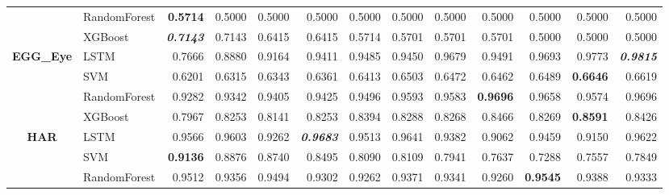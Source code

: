 \begin{table}[H]
\begin{adjustbox}{max width=14cm}
\begin{tabular}{|c|l|r|r|r|r|r|r|r|r|r|r|r|}
			                      & RandomForest & \textbf{0.5714}          & 0.5000          & 0.5000          & 0.5000                   & 0.5000 & 0.5000          & 0.5000 & 0.5000          & 0.5000                   & 0.5000          & 0.5000                   \\
			                      & XGBoost      & \textit{\textbf{0.7143}} & 0.7143          & 0.6415          & 0.6415                   & 0.5714 & 0.5701          & 0.5701 & 0.5701          & 0.5000                   & 0.5000          & 0.5000                   \\
			\hline
			\textbf{EGG\_Eye}     & LSTM         & 0.7666                   & 0.8880          & 0.9164          & 0.9411                   & 0.9485 & 0.9450          & 0.9679 & 0.9491          & 0.9693                   & 0.9773          & \textit{\textbf{0.9815}} \\
			                      & SVM          & 0.6201                   & 0.6315          & 0.6343          & 0.6361                   & 0.6413 & 0.6503          & 0.6472 & 0.6462          & 0.6489                   & \textbf{0.6646} & 0.6619                   \\
			                      & RandomForest & 0.9282                   & 0.9342          & 0.9405          & 0.9425                   & 0.9496 & 0.9593          & 0.9583 & \textbf{0.9696} & 0.9658                   & 0.9574          & 0.9696                   \\
			                      & XGBoost      & 0.7967                   & 0.8253          & 0.8141          & 0.8253                   & 0.8394 & 0.8288          & 0.8268 & 0.8466          & 0.8269                   & \textbf{0.8591} & 0.8426                   \\
			\hline
			\textbf{HAR}          & LSTM         & 0.9566                   & 0.9603          & 0.9262          & \textit{\textbf{0.9683}} & 0.9513 & 0.9641          & 0.9382 & 0.9062          & 0.9459                   & 0.9150          & 0.9622                   \\
			                      & SVM          & \textbf{0.9136}          & 0.8876          & 0.8740          & 0.8495                   & 0.8090 & 0.8109          & 0.7941 & 0.7637          & 0.7288                   & 0.7557          & 0.7849                   \\
			                      & RandomForest & 0.9512                   & 0.9356          & 0.9494          & 0.9302                   & 0.9262 & 0.9371          & 0.9341 & 0.9260          & \textbf{0.9545}          & 0.9388          & 0.9333                   \\

\end{tabular}
\end{adjustbox}
\end{table}
